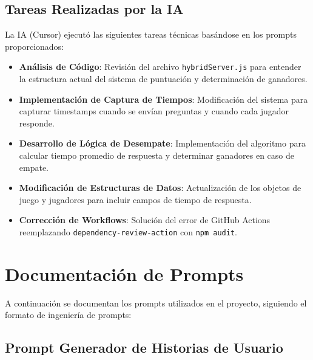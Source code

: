 \documentclass[12pt,a4paper]{article}
\begin{document}
\subsection{Tareas Realizadas por la IA}

La IA (Cursor) ejecutó las siguientes tareas técnicas basándose en los prompts proporcionados:

\begin{itemize}
    \item \textbf{Análisis de Código}: Revisión del archivo \texttt{hybridServer.js} para entender la estructura actual del sistema de puntuación y determinación de ganadores.
    
    \item \textbf{Implementación de Captura de Tiempos}: Modificación del sistema para capturar timestamps cuando se envían preguntas y cuando cada jugador responde.
    
    \item \textbf{Desarrollo de Lógica de Desempate}: Implementación del algoritmo para calcular tiempo promedio de respuesta y determinar ganadores en caso de empate.
    
    \item \textbf{Modificación de Estructuras de Datos}: Actualización de los objetos de juego y jugadores para incluir campos de tiempo de respuesta.
    
    \item \textbf{Corrección de Workflows}: Solución del error de GitHub Actions reemplazando \texttt{dependency-review-action} con \texttt{npm audit}.
\end{itemize}

\section{Documentación de Prompts}

A continuación se documentan los prompts utilizados en el proyecto, siguiendo el formato de ingeniería de prompts:

\subsection{Prompt Generador de Historias de Usuario}
\end{document}
